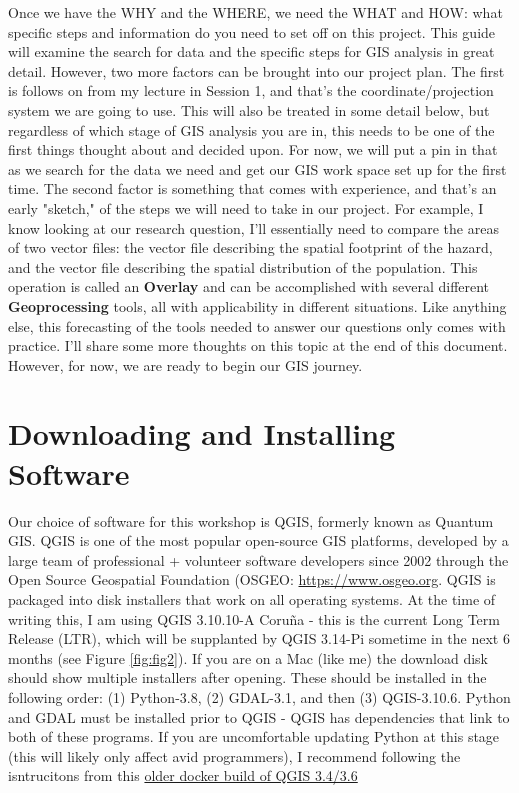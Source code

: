 \documentclass{article}
\begin{document}
Once we have the WHY and the WHERE, we need the WHAT and HOW: what specific steps and information do you need to set off on this project. This guide will examine the search for data and the specific steps for GIS analysis in great detail. However, two more factors can be brought into our project plan. The first is follows on from my lecture in Session 1, and that's the coordinate/projection system we are going to use. This will also be treated in some detail below, but regardless of which stage of GIS analysis you are in, this needs to be one of the first things thought about and decided upon. For now, we will put a pin in that as we search for the data we need and get our GIS work space set up for the first time. The second factor is something that comes with experience, and that's an early "sketch," of the steps we will need to take in our project. For example, I know looking at our research question, I'll essentially need to compare the areas of two vector files: the vector file describing the spatial footprint of the hazard, and the vector file describing the spatial distribution of the population. This operation is called an \textbf{Overlay} and can be accomplished with several different \textbf{Geoprocessing} tools, all with applicability in different situations. Like anything else, this forecasting of the tools needed to answer our questions only comes with practice. I'll share some more thoughts on this topic at the end of this document. However, for now, we are ready to begin our GIS journey. 

\section{Downloading and Installing Software}

Our choice of software for this workshop is QGIS, formerly known as Quantum GIS. QGIS is one of the most popular open-source GIS platforms, developed by a large team of professional + volunteer software developers since 2002 through the Open Source Geospatial Foundation (OSGEO: \href{https://www.osgeo.org}{https://www.osgeo.org}. QGIS is packaged into disk installers that work on all operating systems. At the time of writing this, I am using QGIS 3.10.10-A Coru\~na - this is the current Long Term Release (LTR), which will be supplanted by QGIS 3.14-Pi sometime in the next 6 months (see Figure \ref{fig:fig2}). If you are on a Mac (like me) the download disk should show multiple installers after opening. These should be installed in the following order: (1) Python-3.8, (2) GDAL-3.1, and then (3) QGIS-3.10.6. Python and GDAL must be installed prior to QGIS - QGIS has dependencies that link to both of these programs. If you are uncomfortable updating Python at this stage (this will likely only affect avid programmers), I recommend following the isntrucitons from this \href{https://github.com/rafdouglas/qgis_desktop_docker}{older docker build of QGIS 3.4/3.6}
\end{document}
